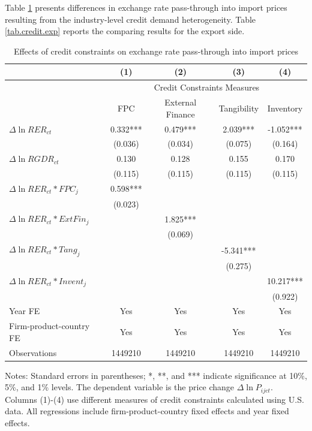 \documentclass[12pt]{article}
\begin{document}
Table \ref{tab.credit} presents differences in exchange rate pass-through into import prices resulting from the industry-level credit demand heterogeneity. Table \ref{tab.credit.exp} reports the comparing results for the export side. 

\begin{table}[htbp]
	\centering
	\caption{Effects of credit constraints on exchange rate pass-through into import prices}
	\begin{threeparttable}	
		\begin{tabular}{lcccc}
			\toprule
			& (1)   & (2)   & (3)   & (4) \\
			\midrule
			 & \multicolumn{4}{c}{Credit Constraints Measures} \\
			& FPC   & External Finance & Tangibility & Inventory \\
			\midrule
			$\Delta \ln RER_{ct}$ & 0.332*** & 0.479*** & 2.039*** & -1.052*** \\
			& (0.036) & (0.034) & (0.075) & (0.164) \\
			$\Delta \ln RGDR_{ct}$ & 0.130 & 0.128 & 0.155 & 0.170 \\
			& (0.115) & (0.115) & (0.115) & (0.115) \\
			$\Delta \ln RER_{ct}*FPC_{j}$ & 0.598*** &       &       &  \\
			& (0.023) &       &       &  \\
			$\Delta \ln RER_{ct}*ExtFin_{j}$ &       & 1.825*** &       &  \\
			&       & (0.069) &       &  \\
			$\Delta \ln RER_{ct}*Tang_{j}$ &       &       & -5.341*** &  \\
			&       &       & (0.275) &  \\
			$\Delta \ln RER_{ct}*Invent_{j}$ &       &       &       & 10.217*** \\
			&       &       &       & (0.922) \\
			Year FE  & Yes   & Yes   & Yes   & Yes \\
			Firm-product-country FE & Yes   & Yes   & Yes   & Yes \\
			Observations & 1449210 & 1449210 & 1449210 & 1449210 \\
			\bottomrule
		\end{tabular}
		\begin{tablenotes}
			\footnotesize
			\item[Notes:] Standard errors in parentheses; *, **, and *** indicate significance at 10\%, 5\%, and 1\% levels. The dependent variable is the price change $\Delta \ln P_{ijct}$. Columns (1)-(4) use different measures of credit constraints calculated using U.S. data. All regressions include firm-product-country fixed effects and year fixed effects.
		\end{tablenotes}
	\end{threeparttable}
	\label{tab.credit}
\end{table}
\end{document}
